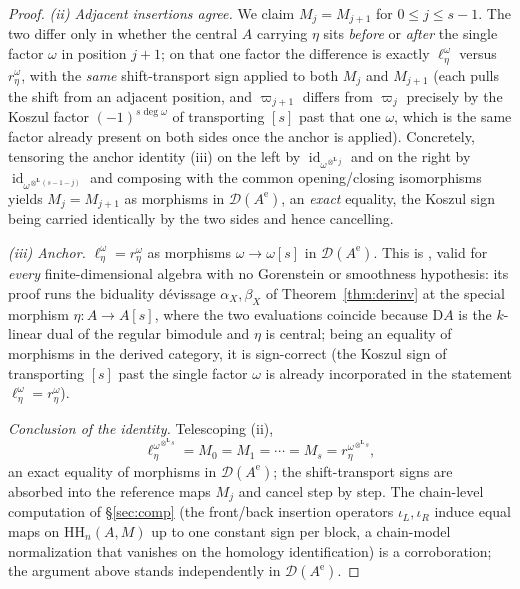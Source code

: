 \documentclass[11pt]{amsart}
\theoremstyle{definition}
\newcommand{\HH}{\mathrm{HH}}
\newcommand{\D}{\mathrm{D}}
\newcommand{\id}{\operatorname{id}}
\newcommand{\Ae}{A^{\mathrm{e}}}
\newcommand{\der}{\mathcal{D}}
\newcommand{\Lotimes}{\otimes^{\mathbf{L}}}
\newcommand{\kk}{k}
\begin{document}
\begin{proof}
\emph{(ii) Adjacent insertions agree.} We claim $M_j=M_{j+1}$ for
$0\le j\le s-1$. The two differ only in whether the central $A$ carrying $\eta$
sits \emph{before} or \emph{after} the single factor $\omega$ in position
$j+1$; on that one factor the difference is exactly
$\ell^{\omega}_\eta$ versus $r^{\omega}_\eta$, with the \emph{same}
shift-transport sign applied to both $M_j$ and $M_{j+1}$ (each pulls the shift
from an adjacent position, and $\varpi_{j+1}$ differs from $\varpi_j$ precisely
by the Koszul factor $(-1)^{s\deg\omega}$ of transporting $[s]$ past that one
$\omega$, which is the same factor already present on both sides once the
anchor is applied). Concretely, tensoring the anchor identity (iii) on the left
by $\id_{\omega^{\Lotimes j}}$ and on the right by $\id_{\omega^{\Lotimes(s-1-j)}}$
and composing with the common opening/closing isomorphisms yields
$M_j=M_{j+1}$ as morphisms in $\der(\Ae)$, an \emph{exact} equality, the
Koszul sign being carried identically by the two sides and hence cancelling.

\emph{(iii) Anchor.} $\ell^{\omega}_\eta=r^{\omega}_\eta$ as morphisms
$\omega\to\omega[s]$ in $\der(\Ae)$. This is \cite[Lemma 6.1]{ArmCox}, valid
for \emph{every} finite-dimensional algebra with no Gorenstein or smoothness
hypothesis: its proof runs the biduality dévissage $\alpha_X,\beta_X$ of
Theorem~\ref{thm:derinv} at the special morphism $\eta\colon A\to A[s]$, where
the two evaluations coincide because $\D A$ is the $\kk$-linear dual of the
regular bimodule and $\eta$ is central; being an equality of morphisms in the
derived category, it is sign-correct (the Koszul sign of transporting $[s]$
past the single factor $\omega$ is already incorporated in the statement
$\ell^\omega_\eta=r^\omega_\eta$).

\emph{Conclusion of the identity.} Telescoping (ii),
\[
\ell^{\omega^{\Lotimes s}}_\eta=M_0=M_1=\cdots=M_s=r^{\omega^{\Lotimes s}}_\eta ,
\]
an exact equality of morphisms in $\der(\Ae)$; the shift-transport signs are
absorbed into the reference maps $M_j$ and cancel step by step. The chain-level
computation of \S\ref{sec:comp} (the front/back insertion operators
$\iota_L,\iota_R$ induce equal maps on $\HH_n(A,M)$ up to one constant sign per
block, a chain-model normalization that vanishes on the homology
identification) is a corroboration; the argument above stands independently in
$\der(\Ae)$.


\end{proof}
\end{document}

